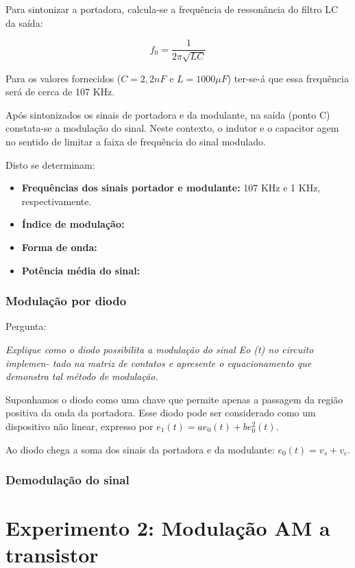 \documentclass[]{report}
\begin{document}
Para sintonizar a portadora, calcula-se a frequência de ressonância do filtro LC da saída:

\begin{equation}
f_0 = \frac{1}{2 \pi \sqrt{LC}}
\end{equation}

Para os valores fornecidos ($C = 2,2 nF$ e $L = 1000 \mu F$) ter-se-á que essa frequência será de cerca de 107 KHz. 

Após sintonizados os sinais de portadora e da modulante, na saída (ponto C) constata-se a modulação do sinal. Neste contexto, o indutor e o capacitor agem no sentido de limitar a faixa de frequência do sinal modulado.

Disto se determinam:
\begin{itemize}
\item{\bf Frequências dos sinais portador e modulante:} 107 KHz e 1 KHz, respectivamente.
\item{\bf Índice de modulação:}
\item{\bf Forma de onda:}
\item{\bf Potência média do sinal:}


\end{itemize}
\subsection{Modulação por diodo}
Pergunta: \begin{flushright}
\textit{Explique como o diodo possibilita a modulação do sinal Eo (t) no circuito implemen-
tado na matriz de contatos e apresente o equacionamento que demonstra tal método
de modulação.}
\end{flushright}

Suponhamos o diodo como uma chave que permite apenas a passagem da região positiva da onda da portadora. Esse diodo pode ser considerado como um dispositivo não linear, expresso por $e_1(t) = a e_0(t) + b e^2_0(t)$. 

Ao diodo chega a soma dos sinais da portadora e da modulante: $e_0(t) = v_s + v_c$.

\subsection{Demodulação do sinal}

\chapter{Experimento 2: Modulação AM a transistor}
\end{document}
